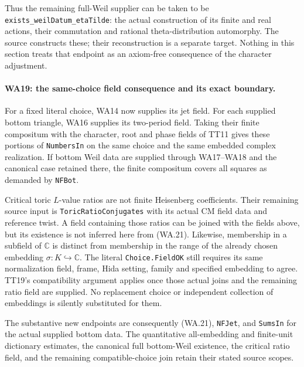 Thus the remaining full-Weil supplier can be taken to be
\texttt{exists\_weilDatum\_etaTilde}: the actual construction
of its finite and real actions, their commutation and rational
theta-distribution automorphy.  The source constructs these;
their reconstruction is a separate target.  Nothing in this
section treats that endpoint as an axiom-free consequence of
the character adjustment.

\paragraph{WA19: the same-choice field consequence and its exact boundary.}
For a fixed literal choice, WA14 now supplies its jet field.
For each supplied bottom triangle, WA16 supplies its two-period
field.  Taking their finite compositum with the character,
root and phase fields of TT11 gives these portions of
\texttt{NumbersIn} on the same choice and the same embedded
complex realization.  If bottom Weil data are supplied through
WA17--WA18 and the canonical case retained there, the finite
compositum covers all squares as demanded by \texttt{NFBot}.

Critical toric $L$-value ratios are not finite Heisenberg
coefficients.  Their remaining source input is
\texttt{ToricRatioConjugates} with its actual CM field data
and reference twist.  A field containing those ratios can be
joined with the fields above, but its existence is not inferred
here from (WA.21).  Likewise, membership in a subfield of
$\mathbb C$ is distinct from membership in the range of the
already chosen embedding $\sigma:K\hookrightarrow\mathbb C$.
The literal \texttt{Choice.FieldOK} still requires its same
normalization field, frame, Hida setting, family and specified
embedding to agree.  TT19's compatibility argument applies
once those actual joins and the remaining ratio field are
supplied.  No replacement choice or independent collection of
embeddings is silently substituted for them.

The substantive new endpoints are consequently (WA.21),
\texttt{NFJet}, and \texttt{SumsIn} for the actual supplied
bottom data.  The quantitative all-embedding and finite-unit
dictionary estimates, the canonical full bottom-Weil existence,
the critical ratio field, and the remaining compatible-choice
join retain their stated source scopes.
